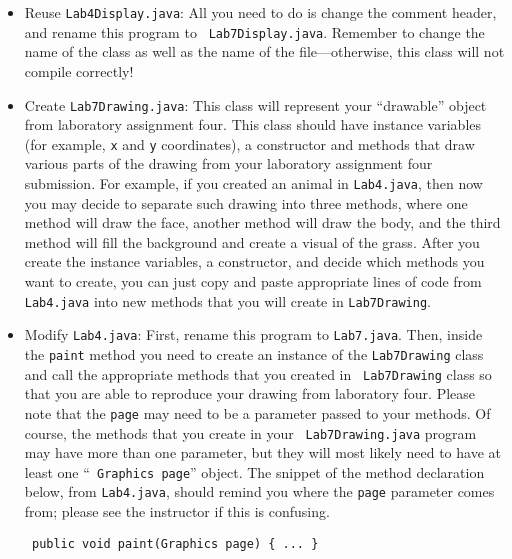 \begin{itemize}

\item Reuse {\tt Lab4Display.java}:  All you need to do is change the comment header, and rename this program to {\tt
  Lab7Display.java}. Remember to change the name of the class as well as the name of the file---otherwise, this class will
  not compile correctly!

\item Create {\tt Lab7Drawing.java}: This class will represent your ``drawable'' object from laboratory assignment four.  This class should have instance variables (for example, {\tt x} and {\tt y} coordinates), a constructor and
  methods that draw various parts of the drawing from your laboratory assignment four submission. For example, if
  you created an animal in {\tt Lab4.java}, then now you may decide to separate such drawing into three methods, where
  one method will draw the face, another method will draw the body, and the third method will fill the background and
  create a visual of the grass. After you create the instance variables, a constructor, and decide which methods you
  want to create, you can just copy and paste appropriate lines of code from {\tt Lab4.java} into new methods that you
  will create in {\tt Lab7Drawing}.

\item Modify {\tt Lab4.java}:  First, rename this program to {\tt Lab7.java}. Then, inside the {\tt paint} method you
  need to create an instance of the {\tt Lab7Drawing} class and call the appropriate methods that you created in {\tt
  Lab7Drawing} class so that you are able to reproduce your drawing from laboratory four. Please note that the {\tt page}
  may need to be a parameter passed to your methods. Of course, the methods that you create in your {\tt
  Lab7Drawing.java} program may have more than one parameter, but they will most likely need to have at least one ``{\tt
  Graphics page}'' object. The snippet of the method declaration below, from {\tt Lab4.java}, should remind you where
  the {\tt page} parameter comes from; please see the instructor if this is confusing. 
  
  \begin{verbatim} public void paint(Graphics page) { ... } \end{verbatim} \vspace{-0.1in}
  \end{itemize}

\vspace{-0.25in} 
